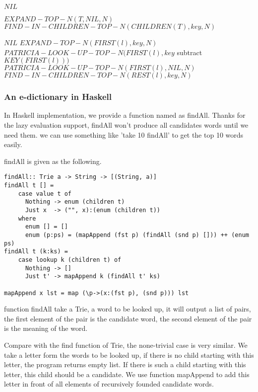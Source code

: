 \documentclass{article}
\begin{document}
\begin{algorithmic}[1]
    \State \Return $NIL$
  \EndIf

    \State \Return $EXPAND-TOP-N(T, NIL, N)$
  \Else
    \State \Return $FIND-IN-CHILDREN-TOP-N(CHILDREN(T), key, N)$
  \EndIf
\EndFunction

    \State \Return $NIL$
    \State \Return $EXPAND-TOP-N(FIRST(l), key, N)$
    \State \Return $PATRICIA-LOOK-UP-TOP-N(FIRST(l), key$ subtract
    $KEY(FIRST(l)))$
    \State \Return $PATRICIA-LOOK-UP-TOP-N(FIRST(l), NIL, N)$
  \ElsIf
    \State \Return $FIND-IN-CHILDREN-TOP-N(REST(l), key, N)$
  \EndIf
\EndFunction
\end{algorithmic}

\subsubsection*{An e-dictionary in Haskell}
In Haskell implementation, we provide a function named as findAll.
Thanks for the lazy evaluation support, findAll won't produce all candidates
words until we need them. we can use something like 'take 10 findAll'
to get the top 10 words easily.

findAll is given as the following.

\lstset{language=Haskell}
\begin{lstlisting}
findAll:: Trie a -> String -> [(String, a)]
findAll t [] =
    case value t of
      Nothing -> enum (children t)
      Just x  -> ("", x):(enum (children t))
    where
      enum [] = []
      enum (p:ps) = (mapAppend (fst p) (findAll (snd p) [])) ++ (enum ps)
findAll t (k:ks) =
    case lookup k (children t) of
      Nothing -> []
      Just t' -> mapAppend k (findAll t' ks)

mapAppend x lst = map (\p->(x:(fst p), (snd p))) lst
\end{lstlisting}

function findAll take a Trie, a word to be looked up, it will output
a list of pairs, the first element of the pair is the candidate word,
the second element of the pair is the meaning of the word.

Compare with the find function of Trie, the none-trivial case is very similar.
We take a letter form the words to be looked up, if there is no child starting
with this letter, the program returns empty list. If there is such a child
starting with this letter, this child should be a candidate. We use function
mapAppend to add this letter in front of all elements of recursively founded
candidate words.
\end{document}
